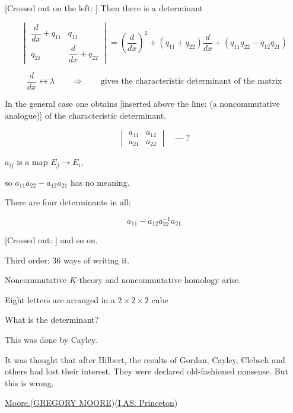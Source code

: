 [Crossed out on the left: ]
Then there is a determinant

\begin{equation*}
\begin{vmatrix}
\dfrac{d}{dx}+q_{11}&q_{12}\\
q_{21}&\dfrac{d}{dx}+q_{22}
\end{vmatrix}
=\left(\frac{d}{dx}\right)^2+(q_{11}+q_{22})\frac{d}{dx}
+(q_{11}q_{22}-q_{12}q_{21})
\tag{2}
\end{equation*}

$$
\frac{d}{dx}\longleftrightarrow\lambda
\qquad\Longrightarrow\qquad\text{gives the characteristic determinant of the matrix}
$$

In the general case one obtains [inserted above the line: (a noncommutative analogue)]
of the characteristic determinant.

$$
\begin{vmatrix}
a_{11}&a_{12}\\
a_{21}&a_{22}
\end{vmatrix}
\quad\text{--- ?}
$$

$a_{ij}$ is a map $E_j\to E_i$,

so $a_{11}a_{22}-a_{12}a_{21}$ has no meaning.

There are four determinants in all:

\begin{equation*}
a_{11}-a_{12}a_{22}^{-1}a_{21}
\tag{3}
\end{equation*}

[Crossed out: ]
and so on.

Third order: 36 ways of writing it.

Noncommutative $K$-theory and noncommutative homology arise.

Eight letters are arranged in a $2\times2\times2$ cube

What is the determinant?

This was done by Cayley.

It was thought that after Hilbert, the results of Gordan, Cayley, Clebsch and others
had lost their interest. They were declared old-fashioned nonsense. But this
is wrong.

\underline{\underline{Moore.}}\quad (\underline{GREGORY MOORE})\quad (\underline{I,AS. Princeton})

